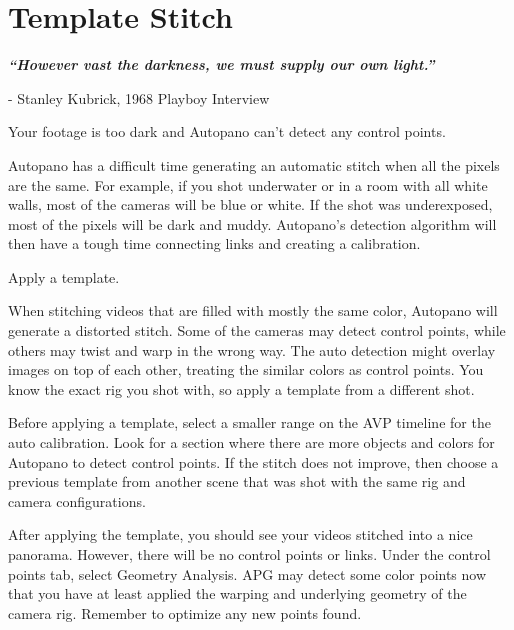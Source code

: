 \chapter{Template Stitch}
\pagecolor{white}
\label{chap:40}
\begin{fullwidth}

{\itshape\bfseries “However vast the darkness, we must supply our own light.”}

- Stanley Kubrick, 1968 Playboy Interview
\vspace{\baselineskip}

\problem

{\large Your footage is too dark and Autopano can’t detect any control points. \par}

Autopano has a difficult time generating an automatic stitch when all the pixels are the same. For example, if you shot underwater or in a room with all white walls, most of the cameras will be blue or white. If the shot was underexposed, most of the pixels will be dark and muddy. Autopano’s detection algorithm will then have a tough time connecting links and creating a calibration.

\solutions

{\large Apply a template. \par}

When stitching videos that are filled with mostly the same color, Autopano will generate a distorted stitch. Some of the cameras may detect control points, while others may twist and warp in the wrong way. The auto detection might overlay images on top of each other, treating the similar colors as control points. You know the exact rig you shot with, so apply a template from a different shot.


Before applying a template, select a smaller range on the AVP timeline for the auto calibration. Look for a section where there are more objects and colors for Autopano to detect control points. If the stitch does not improve, then choose a previous template from another scene that was shot with the same rig and camera configurations. 


After applying the template, you should see your videos stitched into a nice panorama. However, there will be no control points or links. Under the control points tab, select Geometry Analysis. APG may detect some color points now that you have at least applied the warping and underlying geometry of the camera rig. Remember to optimize any new points found.


\end{fullwidth}
